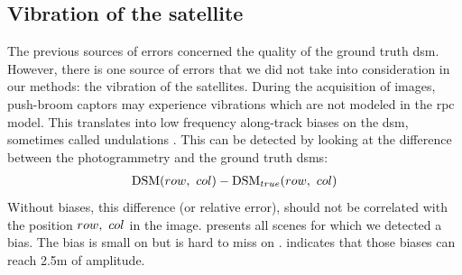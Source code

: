 \subsection{Vibration of the satellite}\label{sec:vibrations}
The previous sources of errors concerned the quality of the ground truth \acrshort{dsm}. However, there is one source of errors that we did not take into consideration in our methods: the vibration of the satellites. During the acquisition of images, push-broom captors may experience vibrations which are not modeled in the \acrshort{rpc} model. This translates into low frequency along-track biases on the \acrshort{dsm}, sometimes called undulations \cite{hugonnet_uncertainty_2022}. This can be detected by looking at the difference between the photogrammetry and the ground truth \acrshort{dsm}s:
\begin{align}
    \mathrm{DSM}(row, ~col)-\mathrm{DSM}_{true}(row, ~col)
\end{align}
Without biases, this difference (or relative error), should not be correlated with the position $row, ~col$ in the image.  presents all scenes for which we detected a bias. The bias is small on  but is hard to miss on .  indicates that those biases can reach 2.5m of amplitude.

